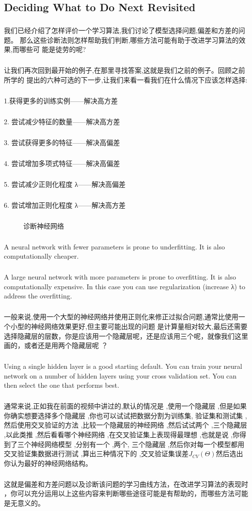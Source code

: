 \documentclass{article}
\begin{document}
\begin{CJK}{UTF8}{gbsn}
\subsection{Deciding What to Do Next Revisited}
\subparagraph{}
我们已经介绍了怎样评价一个学习算法,我们讨论了模型选择问题,偏差和方差的问题。
那么这些诊断法则怎样帮助我们判断,哪些方法可能有助于改进学习算法的效果,而哪些可
能是徒劳的呢?
\subparagraph{}
\begin{figure}[H]
\label{fig:643}
\end{figure}
让我们再次回到最开始的例子,在那里寻找答案,这就是我们之前的例子。回顾之前所学的
提出的六种可选的下一步,让我们来看一看我们在什么情况下应该怎样选择:
\subparagraph{}
1.获得更多的训练实例——解决高方差
\subparagraph{}
2. 尝试减少特征的数量——解决高方差
\subparagraph{}
3. 尝试获得更多的特征——解决高偏差
\subparagraph{}
4. 尝试增加多项式特征——解决高偏差
\subparagraph{}
5. 尝试减少正则化程度 λ——解决高偏差
\subparagraph{}
6. 尝试增加正则化程度 λ——解决高方差
\subparagraph{}
\begin{figure}[H]
\label{fig:649}
\caption{诊断神经网络}
\end{figure}
\subparagraph{}
A neural network with fewer parameters is prone to underfitting. It is also computationally cheaper.
\subparagraph{}
A large neural network with more parameters is prone to overfitting. It is also computationally expensive. In this case you can use regularization (increase λ) to address the overfitting.
\subparagraph{}
一般来说,使用一个大型的神经网络并使用正则化来修正过拟合问题,通常比使用一个小型的神经网络效果更好,但主要可能出现的问题 是计算量相对较大,最后还需要选择隐藏层的层数，你是应该用一个隐藏层呢，还是应该用三个呢，就像我们这里画的，或者还是用两个隐藏层呢 ？
\subparagraph{}
Using a single hidden layer is a good starting default. You can train your neural network on a number of hidden layers using your cross validation set. You can then select the one that performs best. 
\subparagraph{}
通常来说,正如我在前面的视频中讲过的,默认的情况是 ,使用一个隐藏层 ,但是如果你确实想要选择多个隐藏层 ,你也可以试试把数据分割为训练集, 验证集和测试集 ,然后使用交叉验证的方法 ,比较一个隐藏层的神经网络 ,然后试试两个 ,三个隐藏层 ,以此类推 ,然后看看哪个神经网络 ,在交叉验证集上表现得最理想 ,也就是说 ,你得到了三个神经网络模型 ,分别有一个 ,两个, 三个隐藏层 ,然后你对每一个模型都用交叉验证集数据进行测试 ,算出三种情况下的 ,交叉验证集误差$J_{CV}(\Theta)$然后选出你认为最好的神经网络结构。
\subparagraph{}
这就是偏差和方差问题以及诊断该问题的学习曲线方法，在改进学习算法的表现时 ，你可以充分运用以上这些内容来判断哪些途径可能是有帮助的，而哪些方法可能是无意义的。 

\end{CJK}
\end{document}
